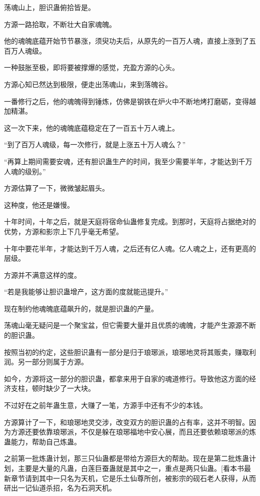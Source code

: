 
\begin{this_body}

荡魂山上，胆识蛊俯拾皆是。

方源一路拾取，不断壮大自家魂魄。

他的魂魄底蕴开始节节暴涨，须臾功夫后，从原先的一百万人魂，直接上涨到了五百万人魂级。

一种鼓胀至极，即将要被撑爆的感觉，充盈方源的心头。

方源心知已然达到极限，便走出荡魂山，来到落魄谷。

一番修行之后，他的魂魄得到锤炼，仿佛是钢铁在炉火中不断地烤打磨砺，变得越加精湛。

这一次下来，他的魂魄底蕴稳定在了一百五十万人魂上。

“到了百万人魂级，每一次修行，就是上涨五十万人魂么？”

“再算上期间需要安魂，还有胆识蛊生产的时间，我至少需要半年，才能达到千万人魂的级别。”

方源估算了一下，微微皱起眉头。

这种度，他还是嫌慢。

十年时间，十年之后，就是天庭将宿命仙蛊修复完成。到那时，天庭将占据绝对的优势，方源和影宗上下几乎毫无希望。

十年中要花半年，才能达到千万人魂，之后还有亿人魂。亿人魂之上，还有更高的层级。

方源并不满意这样的度。

“若是我能够让胆识蛊增产，这方面的度就能迅提升。”

现在制约他魂魄底蕴飙升的，就是胆识蛊的产量。

荡魂山毫无疑问是一个聚宝盆，但它需要大量并且优质的魂魄，才能产生源源不断的胆识蛊。

按照当初的约定，这些胆识蛊有一部分是归于琅琊派，琅琊地灵将其贩卖，赚取利润。另一部分则属于方源。

如今，方源将这一部分的胆识蛊，都拿来用于自家的魂道修行。导致他这方面的经济支柱，顿时缺少了一大块。

不过好在之前年蛊生意，大赚了一笔，方源手中还有不少的本钱。

方源算计了一下，和琅琊地灵交涉，改变双方的胆识蛊的占有率，这并不明智。因为方源还要依靠琅琊派，不仅是躲在琅琊福地中安心展，而且还要依赖琅琊派的炼蛊能力，帮助自己炼蛊。

之前第一批炼蛊计划，那三只仙蛊都是带给方源巨大的帮助。现在是第二批炼蛊计划，主要是大量的凡蛊，白莲巨蚕蛊就是其中之一，重点是两只仙蛊。[看本书最新章节请到其中一只名为天机，它是乐土仙尊所创，被影宗的砚石老人获得，从而研出一记仙道杀招，名为石洞天机。


\end{this_body}
